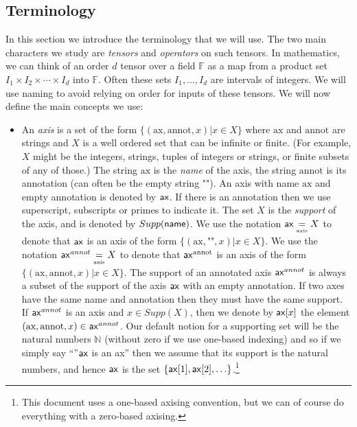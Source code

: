 \documentclass{article}
\newcommand{\defaxis}{\underset{\text{\tiny axis}}{=}}
\begin{document}
\subsection{Terminology}

In this section we introduce the terminology that we will use.
The two main characters we study are \emph{tensors} and \emph{operators} on such tensors.
In mathematics, we can think of an order $d$ tensor over a field $\mathbb{F}$ as a map from a product set $I_1 \times I_2 \times \cdots \times I_d$ into $\mathbb{F}$. Often these sets $I_1,\ldots,I_d$ are intervals of  integers.
We will use naming to avoid relying on order for inputs of these tensors.
We will now define the main concepts we use:

\begin{itemize}

  
  \item An \emph{axis} is a set of the form $\{ (\text{ax} ,\text{annot},x) | x\in X \}$ where $\text{ax}$ and $\text{annot}$ are strings and $X$ is a well ordered set that can be infinite or finite. (For example, $X$ might be the integers, strings, tuples of integers or strings, or finite subsets of any of those.)   The string $\text{ax}$ is the \emph{name} of the axis, the string $\text{annot}$ is its annotation (can often be the empty string $\text{""}$). An axis with name $\text{ax}$ and empty annotation is denoted by $\mathsf{ax}$. If there is an annotation then we use superscript, subscripts or primes to indicate it. The  set $X$ is the \emph{support} of the axis, and is denoted by $Supp(\mathsf{name})$.  We use the notation $\name{ax} \defaxis X$ to denote that $\mathsf{ax}$ is an axis of the form $\{ (\text{ax},\text{""},x) | x\in  X \}$.  We use the notation $\name{ax}^{annot} \defaxis X$ to denote that $\mathsf{ax}^{\text{annot}}$ is an axis of the form $\{(\text{ax},\text{annot},x) | x\in X \}$. The support of an annotated axis $\mathsf{ax}^{annot}$ is always a subset of the support of the axis $\mathsf{ax}$ with an empty annotation.  If two axes have the same name and annotation then they must have the same support. If $\mathsf{ax}^{annot}$ is an axis and $x \in Supp(X)$, then we denote by $\mathsf{ax}[x]$ the element $(\text{ax},\text{annot},x) \in \mathsf{ax}^{annot}$.  Our default notion for a supporting set will be the natural numbers $\mathbb{N}$ (without zero if we use one-based indexing) and so if we simply say ``''$\mathsf{ax}$ is an ax'' then we assume that its support is the natural numbers, and hence $\mathsf{ax}$ is the set $\{ \mathsf{ax}[1],\mathsf{ax}[2],\ldots \}$.\footnote{This document uses a one-based axising convention, but we can of course do everything with a zero-based axising.}



\end{itemize}
\end{document}
